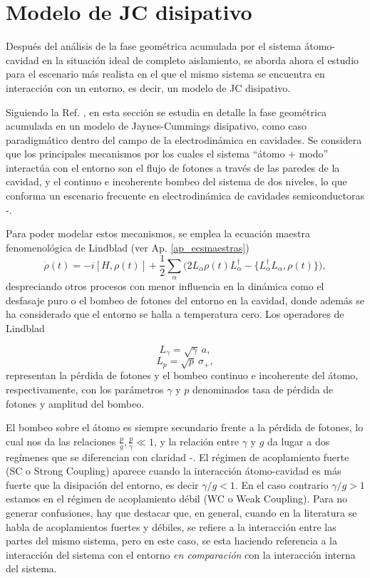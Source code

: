 \section{Modelo de JC disipativo} 
\label{sec3:jcm disipativo}

Después del análisis de la fase geométrica acumulada por el sistema átomo-cavidad en la situación ideal de completo aislamiento, se aborda ahora el estudio para el escenario más realista en el que el mismo sistema se encuentra en interacción con un entorno, es decir, un modelo de JC disipativo.

Siguiendo la Ref. \cite{TesisViotti}, en esta sección se estudia en detalle la fase geométrica acumulada en un modelo de Jaynes-Cummings disipativo, como caso paradigmático dentro del campo de la electrodinámica en cavidades. Se considera que los principales mecanismos por los cuales el sistema “átomo + modo” interactúa con el entorno son el flujo de fotones a través de las paredes de la cavidad, y el continuo e incoherente bombeo del sistema de dos niveles, lo que conforma un escenario frecuente en electrodinámica de cavidades semiconductoras \cite{Khitrova2006}-\cite{DelValle2009}. 

Para poder modelar estos mecanismos, se emplea la ecuación maestra fenomenológica de Lindblad (ver Ap. \ref{ap_ecsmaestras})
\begin{equation}\label{ec3:lindblad}
\dot{\rho}(t) = -i [H, \rho(t)] + \frac{1}{2} \sum_\alpha \big( 2L_\alpha \rho(t) L_\alpha^{\dagger} - \{ L_\alpha^{\dagger}L_\alpha, \rho(t) \} \big),
\end{equation}
despreciando otros procesos con menor influencia en la dinámica como el desfasaje puro o el bombeo de fotones del entorno en la cavidad, donde además se ha considerado que el entorno se halla a temperatura cero. Los operadores de Lindblad

\begin{equation}
L_\gamma = \sqrt{\gamma} \ a,
\end{equation}
\begin{equation}
L_p = \sqrt{p} \ \sigma_+,
\end{equation}
representan la pérdida de fotones y el bombeo continuo e incoherente del átomo, respectivamente, con los parámetros $\gamma$ y $p$ denominados tasa de pérdida de fotones y amplitud del bombeo. 

El bombeo sobre el átomo es siempre secundario frente a la pérdida de fotones, lo cual nos da las relaciones $\frac{p}{g},\frac{p}{\gamma} \ll 1$, y la relación entre $\gamma$ y $g$ da lugar a dos regímenes que se diferencian con claridad \cite{Carmi1989}-\cite{Lodhal2015}. El régimen de acoplamiento fuerte (SC o Strong Coupling) aparece cuando la interacción átomo-cavidad es más fuerte que la disipación del entorno, es decir $\gamma /g <1$. En el caso contrario $\gamma/g>1$ estamos en el régimen de acoplamiento débil (WC o Weak Coupling). Para no generar confusiones, hay que destacar que, en general, cuando en la literatura se habla de acoplamientos fuertes y débiles, se refiere a la interacción entre las partes del mismo sistema, pero en este caso, se esta haciendo referencia a la interacción del sistema con el entorno \textit{en comparación} con la interacción interna del sistema.
